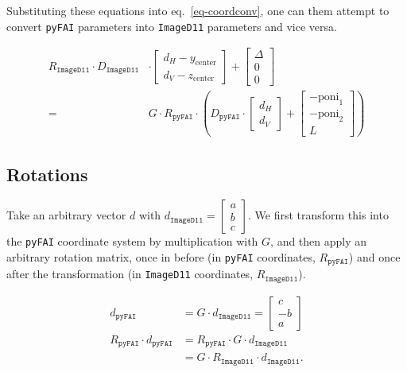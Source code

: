 \documentclass[12pt]{article}
\begin{document}
Substituting these equations into eq.~\ref{eq-coordconv}, one can them
attempt to convert \texttt{pyFAI} parameters into \texttt{ImageD11}
parameters and vice versa.

\begin{align}
  R_{\mathtt{ImageD11}}
  \cdot
  D_{\mathtt{ImageD11}}
  &
  \cdot
  \begin{bmatrix}
    d_H - y_{\mathrm{center}} \\
    d_V - z_{\mathrm{center}}
  \end{bmatrix}
  +
  \begin{bmatrix} \Delta \\ 0 \\ 0 \end{bmatrix}
  \nonumber \\
  = &
  G \cdot
  R_{\mathtt{pyFAI}}
  \cdot
  \left(
  D_{\mathtt{pyFAI}}
  \cdot
  \begin{bmatrix} d_H \\ d_V \end{bmatrix}
  +
  \begin{bmatrix} -\mathrm{poni}_1 \\ -\mathrm{poni}_2 \\ L \end{bmatrix}
  \right)
  \label{eq-transformation}
\end{align}

\subsection{Rotations}

Take an arbitrary vector $d$ with $d_{\mathtt{ImageD11}}
= \begin{bmatrix} a \\ b \\ c \end{bmatrix}$. We first transform this
into the \texttt{pyFAI} coordinate system by multiplication with $G$,
and then apply an arbitrary rotation matrix, once in before (in
\texttt{pyFAI} coordinates, $R_{\mathtt{pyFAI}}$) and once after the
transformation (in \texttt{ImageD11} coordinates,
$R_{\mathtt{ImageD11}}$).

\begin{align}
    d_{\mathtt{pyFAI}}
    & =
    G \cdot d_{\mathtt{ImageD11}}
    = \begin{bmatrix} c \\ -b \\ a \end{bmatrix}
    \\
    R_{\mathtt{pyFAI}} \cdot d_{\mathtt{pyFAI}}
    & =
    R_{\mathtt{pyFAI}} \cdot G \cdot d_{\mathtt{ImageD11}}
    \\
    & = G \cdot R_{\mathtt{ImageD11}} \cdot d_{\mathtt{ImageD11}}.
\end{align}
\end{document}
